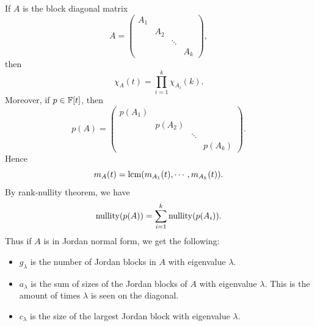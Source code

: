 \documentclass[a4paper]{article}
\begin{document}
If $A$ is the block diagonal matrix
\[
  A =
  \begin{pmatrix}
    A_1\\
    & A_2\\
    & & \ddots\\
    & & & A_k
  \end{pmatrix},
\]
then
\[
  \chi_A(t) = \prod_{i = 1}^k \chi_{A_i}(k).
\]
Moreover, if $p \in {\mathbb{F}}[t]$, then
\[
  p (A) =
  \begin{pmatrix}
    p(A_1)\\
    & p(A_2)\\
    & & \ddots\\
    & & & p(A_k)
  \end{pmatrix}.
\]
Hence
\[
  m_A(t) = \operatorname{lcm} (m_{A_1}(t), \cdots, m_{A_k} (t)).
\]
By rank-nullity theorem, we have
\[
  \operatorname{nullity}(p(A)) = \sum_{i = 1}^k \operatorname{nullity}(p(A_i)).
\]
Thus if $A$ is in Jordan normal form, we get the following:
\begin{itemize}
  \item $g_\lambda$ is the number of Jordan blocks in $A$ with eigenvalue $\lambda$.
  \item $a_\lambda$ is the sum of sizes of the Jordan blocks of $A$ with eigenvalue $\lambda$. This is the amount of times \( \lambda \) is seen on the diagonal.
  \item $c_\lambda$ is the size of the largest Jordan block with eigenvalue $\lambda$.
\end{itemize}
\end{document}
